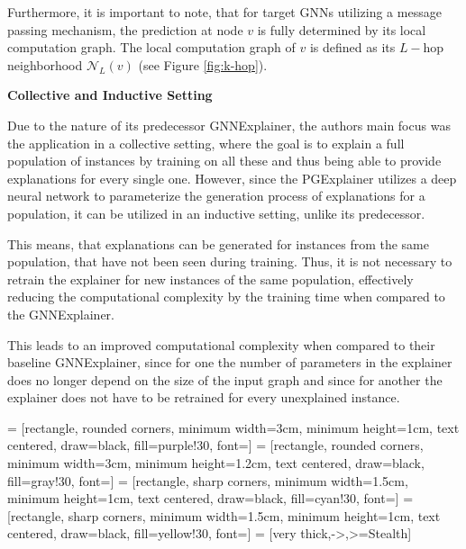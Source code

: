 Furthermore, it is important to note, that for target GNNs utilizing a message passing mechanism, the prediction at node $v$ is fully determined by its local computation graph. The local computation graph of $v$ is defined as its $L-$hop neighborhood $\mathcal{N}_L(v)$ \cite{ying2019gnnexplainer} (see Figure \ref{fig:k-hop}).\bigskip

\textbf{Collective and Inductive Setting}\par
Due to the nature of its predecessor GNNExplainer, the authors main focus was the application in a collective setting, where the goal is to explain a full population of instances by training on all these and thus being able to provide explanations for every single one. However, since the PGExplainer utilizes a deep neural network to parameterize the generation process of explanations for a population, it can be utilized in an inductive setting, unlike its predecessor. 

This means, that explanations can be generated for instances from the same population, that have not been seen during training. Thus, it is not necessary to retrain the explainer for new instances of the same population, effectively reducing the computational complexity by the training time when compared to the GNNExplainer.


This leads to an improved computational complexity when compared to their baseline GNNExplainer, since for one the number of parameters in the explainer does no longer depend on the size of the input graph and since for another the explainer does not have to be retrained for every unexplained instance.

 = [rectangle, rounded corners, minimum width=3cm, minimum height=1cm, text centered, draw=black, fill=purple!30, font=\small]
 = [rectangle, rounded corners, minimum width=3cm, minimum height=1.2cm, text centered, draw=black, fill=gray!30, font=\small]
 = [rectangle, sharp corners, minimum width=1.5cm, minimum height=1cm, text centered, draw=black, fill=cyan!30, font=\small]
 = [rectangle, sharp corners, minimum width=1.5cm, minimum height=1cm, text centered, draw=black, fill=yellow!30, font=\small]
 = [very thick,->,>=Stealth]    %

